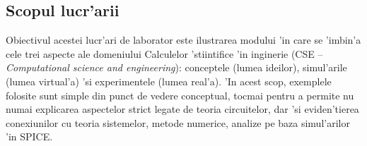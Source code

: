\subsection*{Scopul lucr'arii}

Obiectivul acestei lucr'ari de laborator este ilustrarea modului 'in care se 'imbin'a cele trei aspecte ale domeniului Calculelor 'stiintifice 'in inginerie (CSE -- \textit{Computational science and engineering}): conceptele (lumea ideilor), simul'arile (lumea virtual'a) 'si experimentele (lumea real'a). 'In acest scop, exemplele folosite sunt simple din punct de vedere conceptual, tocmai pentru a permite nu numai explicarea aspectelor strict legate de teoria circuitelor, dar 'si eviden'tierea conexiunilor cu teoria sistemelor, metode numerice, analize pe baza simul'arilor 'in SPICE. 

%
%

